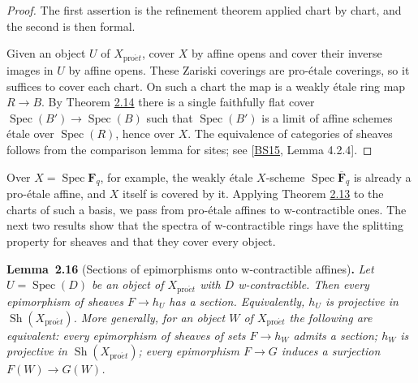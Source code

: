 \documentclass[11pt]{article}
\newenvironment{bpstatement}[2]{\par\addvspace{0.6\baselineskip}\noindent\textbf{#1}#2\textbf{.}\enspace\ignorespaces}
  {\par\addvspace{0.4\baselineskip}}
\newenvironment{bpstatementit}[2]{\begin{bpstatement}{#1}{#2}\itshape\ignorespaces}{\end{bpstatement}}
\providecommand{\Sh}{}\renewcommand{\Sh}{\operatorname{Sh}}
\begin{document}
\begin{proof}[{Proof}]\label{bp45}%
The first assertion is the refinement theorem applied chart by chart, and the second is then formal.

Given an object \(U\) of \(X_{\mathrm{pro}\acute{e}t}\), cover \(X\) by affine opens and cover their inverse images in \(U\) by affine opens. These Zariski coverings are pro-étale coverings, so it suffices to cover each chart. On such a chart the map is a weakly étale ring map \(R\to B\). By Theorem \hyperref[bp40]{2.14} there is a single faithfully flat cover \(\operatorname{Spec}(B')\to\operatorname{Spec}(B)\) such that \(\operatorname{Spec}(B')\) is a limit of affine schemes étale over \(\operatorname{Spec}(R)\), hence over \(X\). The equivalence of categories of sheaves follows from the comparison lemma for sites; see [\hyperref[bp191]{BS15}, Lemma 4.2.4].
\end{proof}

\label{bp46}%
Over \(X=\operatorname{Spec}\mathbf F_q\), for example, the weakly étale \(X\)-scheme \(\operatorname{Spec}\overline{\mathbf F}_q\) is already a pro-étale affine, and \(X\) itself is covered by it. Applying Theorem \hyperref[bp37]{2.13} to the charts of such a basis, we pass from pro-étale affines to w-contractible ones. The next two results show that the spectra of w-contractible rings have the splitting property for sheaves and that they cover every object.

\label{bp47}%
\begin{bpstatementit}{Lemma~2.16}{ (Sections of epimorphisms onto w-contractible affines)}
Let \(U=\operatorname{Spec}(D)\) be an object of \(X_{\mathrm{pro}\acute{e}t}\) with \(D\) w-contractible. Then every epimorphism of sheaves \(F\to h_U\) has a section. Equivalently, \(h_U\) is projective in \(\Sh(X_{\mathrm{pro}\acute{e}t})\). More generally, for an object \(W\) of \(X_{\mathrm{pro}\acute{e}t}\) the following are equivalent: every epimorphism of sheaves of sets \(F\to h_W\) admits a section; \(h_W\) is projective in \(\Sh(X_{\mathrm{pro}\acute{e}t})\); every epimorphism \(F\to G\) induces a surjection \(F(W)\to G(W)\).
\end{bpstatementit}
\end{document}
